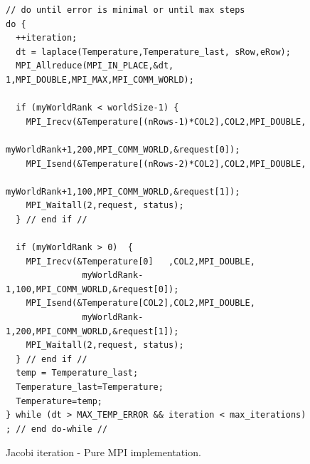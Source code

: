 \begin{figure} [t!]
\centering
\captionsetup{justification=centering, singlelinecheck=false}
\begin{lstlisting}[style=CStyle]
// do until error is minimal or until max steps
do {
  ++iteration;
  dt = laplace(Temperature,Temperature_last, sRow,eRow);
  MPI_Allreduce(MPI_IN_PLACE,&dt, 1,MPI_DOUBLE,MPI_MAX,MPI_COMM_WORLD);

  if (myWorldRank < worldSize-1) { 
    MPI_Irecv(&Temperature[(nRows-1)*COL2],COL2,MPI_DOUBLE,
               myWorldRank+1,200,MPI_COMM_WORLD,&request[0]);
    MPI_Isend(&Temperature[(nRows-2)*COL2],COL2,MPI_DOUBLE,
              myWorldRank+1,100,MPI_COMM_WORLD,&request[1]);
    MPI_Waitall(2,request, status);
  } // end if //  

  if (myWorldRank > 0)  {
    MPI_Irecv(&Temperature[0]   ,COL2,MPI_DOUBLE,
               myWorldRank-1,100,MPI_COMM_WORLD,&request[0]);
    MPI_Isend(&Temperature[COL2],COL2,MPI_DOUBLE,
               myWorldRank-1,200,MPI_COMM_WORLD,&request[1]);
    MPI_Waitall(2,request, status);
  } // end if //   
  temp = Temperature_last;
  Temperature_last=Temperature;
  Temperature=temp;           
} while (dt > MAX_TEMP_ERROR && iteration < max_iterations) ; // end do-while //
\end{lstlisting}    
\caption{Jacobi iteration - Pure MPI implementation.}
\label{fig:JacobiMPI}
\end{figure}




\medskip

